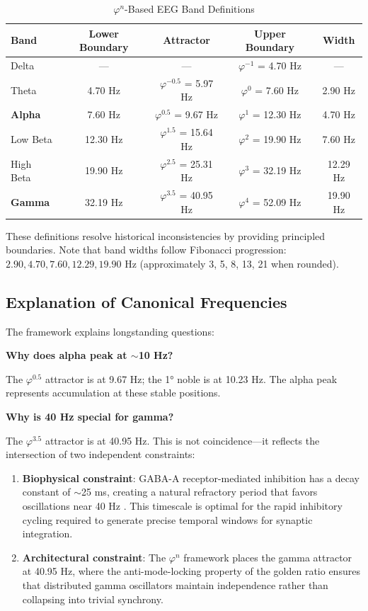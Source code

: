 \documentclass[11pt,a4paper]{article}
\newcommand{\phisym}{\varphi}
\begin{document}
\begin{table}[H]
\centering
\caption{$\phisym^n$-Based EEG Band Definitions}
\label{tab:band_defs}
\begin{tabular}{@{}lcccc@{}}
\toprule
Band & Lower Boundary & Attractor & Upper Boundary & Width \\
\midrule
Delta & --- & --- & $\phisym^{-1}$ = 4.70 Hz & --- \\
Theta & 4.70 Hz & $\phisym^{-0.5}$ = 5.97 Hz & $\phisym^{0}$ = 7.60 Hz & 2.90 Hz \\
\textbf{Alpha} & 7.60 Hz & $\phisym^{0.5}$ = 9.67 Hz & $\phisym^{1}$ = 12.30 Hz & 4.70 Hz \\
Low Beta & 12.30 Hz & $\phisym^{1.5}$ = 15.64 Hz & $\phisym^{2}$ = 19.90 Hz & 7.60 Hz \\
High Beta & 19.90 Hz & $\phisym^{2.5}$ = 25.31 Hz & $\phisym^{3}$ = 32.19 Hz & 12.29 Hz \\
\textbf{Gamma} & 32.19 Hz & $\phisym^{3.5}$ = 40.95 Hz & $\phisym^{4}$ = 52.09 Hz & 19.90 Hz \\
\bottomrule
\end{tabular}
\end{table}

These definitions resolve historical inconsistencies by providing principled boundaries. Note that band widths follow Fibonacci progression: $2.90, 4.70, 7.60, 12.29, 19.90$ Hz (approximately 3, 5, 8, 13, 21 when rounded).

\subsection{Explanation of Canonical Frequencies}

The framework explains longstanding questions:

\textbf{Why does alpha peak at $\sim$10 Hz?}

The $\phisym^{0.5}$ attractor is at 9.67 Hz; the 1° noble is at 10.23 Hz. The alpha peak represents accumulation at these stable positions.

\textbf{Why is 40 Hz special for gamma?}

The $\phisym^{3.5}$ attractor is at 40.95 Hz. This is not coincidence---it reflects the intersection of two independent constraints:

\begin{enumerate}
    \item \textbf{Biophysical constraint}: GABA-A receptor-mediated inhibition has a decay constant of $\sim$25 ms, creating a natural refractory period that favors oscillations near 40 Hz \citep{buzsaki2006}. This timescale is optimal for the rapid inhibitory cycling required to generate precise temporal windows for synaptic integration.

    \item \textbf{Architectural constraint}: The $\phisym^n$ framework places the gamma attractor at 40.95 Hz, where the anti-mode-locking property of the golden ratio ensures that distributed gamma oscillators maintain independence rather than collapsing into trivial synchrony.
\end{enumerate}
\end{document}
